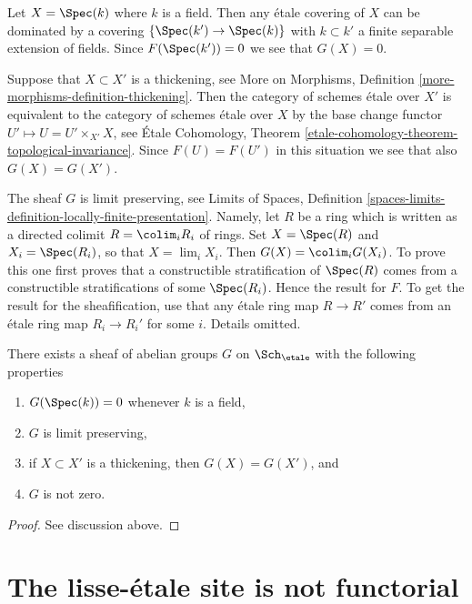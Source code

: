 \medskip\noindent
Let $X = \Spec(k)$ where $k$ is a field.
Then any \'etale covering of $X$ can be dominated
by a covering $\{\Spec(k') \to \Spec(k)\}$ with $k \subset k'$
a finite separable extension of fields. Since $F(\Spec(k')) = 0$
we see that $G(X) = 0$.

\medskip\noindent
Suppose that $X \subset X'$ is a thickening, see
More on Morphisms, Definition \ref{more-morphisms-definition-thickening}.
Then the category of schemes \'etale over $X'$ is equivalent to the
category of schemes \'etale over $X$ by the base change functor
$U' \mapsto U = U' \times_{X'} X$, see
\'Etale Cohomology,
Theorem \ref{etale-cohomology-theorem-topological-invariance}.
Since $F(U) = F(U')$ in this situation we see that also $G(X) = G(X')$.

\medskip\noindent
The sheaf $G$ is limit preserving, see
Limits of Spaces,
Definition \ref{spaces-limits-definition-locally-finite-presentation}.
Namely, let $R$ be a ring which is written as a directed colimit
$R = \colim_i R_i$ of rings. Set $X = \Spec(R)$ and
$X_i = \Spec(R_i)$, so that $X = \lim_i X_i$. Then
$G(X) = \colim_i G(X_i)$. To prove this one first proves that
a constructible stratification of $\Spec(R)$ comes from a constructible
stratifications of some $\Spec(R_i)$. Hence the result for $F$. To
get the result for the sheafification, use that any \'etale ring map
$R \to R'$ comes from an \'etale ring map $R_i \to R_i'$ for some $i$.
Details omitted.

\begin{lemma}
\label{lemma-weird-sheaf}
There exists a sheaf of abelian groups $G$ on
$\Sch_\etale$ with the following properties
\begin{enumerate}
\item $G(\Spec(k)) = 0$ whenever $k$ is a field,
\item $G$ is limit preserving,
\item if $X \subset X'$ is a thickening, then $G(X) = G(X')$, and
\item $G$ is not zero.
\end{enumerate}
\end{lemma}

\begin{proof}
See discussion above.
\end{proof}




\section{The lisse-\'etale site is not functorial}
\label{section-lisse-etale-not-functorial}

